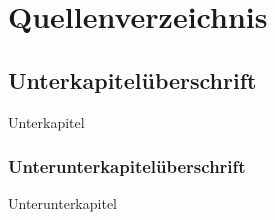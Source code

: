 \section{Quellenverzeichnis}

\label{instal}

\subsection{Unterkapitelüberschrift}

Unterkapitel

\subsubsection{Unterunterkapitelüberschrift}

Unterunterkapitel


